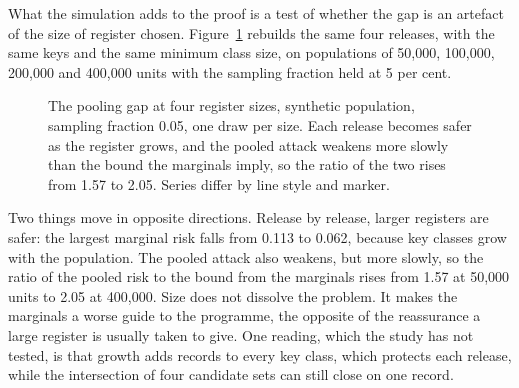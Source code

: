 What the simulation adds to the proof is a test of whether the gap is an artefact of
the size of register chosen. Figure~\ref{c11:fig-scaling} rebuilds the same four
releases, with the same keys and the same minimum class size, on populations of
50,000, 100,000, 200,000 and 400,000 units with the sampling fraction held at 5 per
cent.

\begin{figure}[ht]
\centering
{}
\caption{The pooling gap at four register sizes, synthetic population, sampling
fraction 0.05, one draw per size. Each release becomes safer as the register grows,
and the pooled attack weakens more slowly than the bound the marginals imply, so the
ratio of the two rises from 1.57 to 2.05. Series differ by line style and marker.}
\label{c11:fig-scaling}
\end{figure}

Two things move in opposite directions. Release by release, larger registers are
safer: the largest marginal risk falls from 0.113 to 0.062, because key classes grow
with the population. The pooled attack also weakens, but more slowly, so the ratio of
the pooled risk to the bound from the marginals rises from 1.57 at 50,000 units to
2.05 at 400,000.
Size does not dissolve the problem. It makes the marginals a worse guide to the
programme, the opposite of the reassurance a large register is usually taken to give.
One reading, which the study has not tested, is that growth adds records to every key
class, which protects each release, while the intersection of four candidate sets can
still close on one record.

